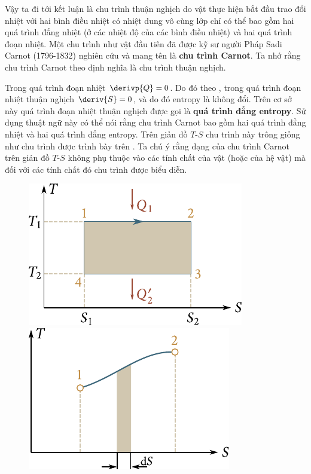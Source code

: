 Vậy ta đi tới kết luận là chu trình thuận nghịch do vật thực hiện bắt đầu trao đổi nhiệt với hai bình điều nhiệt có nhiệt dung vô cùng lớp chỉ có thể bao gồm hai quá trình đẳng nhiệt (ở các nhiệt độ của các bình điều nhiệt) và hai quá trình đoạn nhiệt. Một chu trình như vật đầu tiên đã được kỹ sư người Pháp Sadi Carnot (1796-1832) nghiên cứu và mang tên là \textbf{chu trình Carnot}. Ta nhớ rằng chu trình Carnot theo định nghĩa là chu trình thuận nghịch.

Trong quá trình đoạn nhiệt $\derivp{Q}=0$. Do đó theo , trong quá trình đoạn nhiệt thuận nghịch $\deriv{S}=0$, và do đó entropy là không đổi. Trên cơ sở này quá trình đoạn nhiệt thuận nghịch được gọi là \textbf{quá trình đẳng entropy}. Sử dụng thuật ngữ này có thể nói rằng chu trình Carnot bao gồm hai quá trình đẳng nhiệt và hai quá trình đẳng entropy. Trên giản đồ $T$-$S$ chu trình này trông giống như chu trình được trình bày trên . Ta chú ý rằng dạng của chu trình Carnot trên giản đồ $T$-$S$ không phụ thuộc vào các tính chất của vật (hoặc của hệ vật) mà đối với các tính chất đó chu trình được biểu diễn.

\begin{figure}[!htb]
	\begin{minipage}[t]{0.5\linewidth}
		\begin{center}
			\includegraphics[scale=1.0]{figures/ch_12/fig_12_2.pdf}
			\caption[]{}
			\label{fig:12_2}
		\end{center}
	\end{minipage}
	\hspace{-0.05cm}
	\begin{minipage}[t]{0.5\linewidth}
		\begin{center}
			\includegraphics[scale=1.0]{figures/ch_12/fig_12_3.pdf}
			\caption[]{}
			\label{fig:12_3}
		\end{center}
	\end{minipage}
\end{figure}

